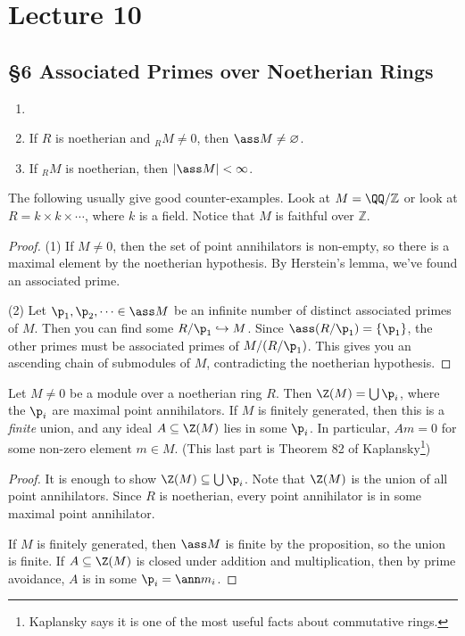  \section{Lecture 10}

 \subsection{\S 6 Associated Primes over Noetherian Rings}

 \begin{proposition}
   \begin{enumerate}
     \item[]
     \item If $R$ is noetherian and ${}_R M\neq 0$, then $\ass M \neq \varnothing$.
     \item If ${}_R M$ is noetherian, then $|\ass M| < \infty$.
   \end{enumerate}
 \end{proposition}
 \begin{example}
   The following usually give good counter-examples. Look at $M=\QQ/\mathbb{Z}$ or look at
   $R=k\times k\times \cdots$, where $k$ is a field. Notice that $M$ is faithful over
   $\mathbb{Z}$.
 \end{example}
 \begin{proof}
   (1) If $M\neq 0$, then the set of point annihilators is non-empty, so there is a maximal
   element by the noetherian hypothesis. By Herstein's lemma, we've found an associated
   prime.

   (2) Let $\p_1,\p_2,\cdots \in \ass M$ be an infinite number of distinct associated
   primes of $M$. Then you can find some $R/\p_1\hookrightarrow M$. Since $\ass
   (R/\p_1)=\{\p_1\}$, the other primes must be associated primes of $M/(R/\p_1)$. This
   gives you an ascending chain of submodules of $M$, contradicting the noetherian
   hypothesis.
 \end{proof}
 \begin{theorem}[6.2]
   Let $M\neq 0$ be a module over a noetherian ring $R$. Then $\Z(M)=\bigcup \p_i$, where
   the $\p_i$ are maximal point annihilators. If $M$ is finitely generated, then this is
   a \emph{finite} union, and any ideal $A\subseteq \Z(M)$ lies in some $\p_i$. In
   particular, $Am=0$ for some non-zero element $m\in M$. (This last part is Theorem 82
   of Kaplansky\footnote{Kaplansky says it is one of the most useful facts about
   commutative rings.})
 \end{theorem}
 \begin{proof}
   It is enough to show $\Z(M)\subseteq \bigcup \p_i$. Note that $\Z(M)$ is the union of
   all point annihilators. Since $R$ is noetherian, every point annihilator is in some
   maximal point annihilator.

   If $M$ is finitely generated, then $\ass M$ is finite by the proposition, so the union
   is finite. If $A\subseteq \Z(M)$ is closed under addition and multiplication, then by
   prime avoidance, $A$ is in some $\p_i=\ann m_i$.
 \end{proof}
